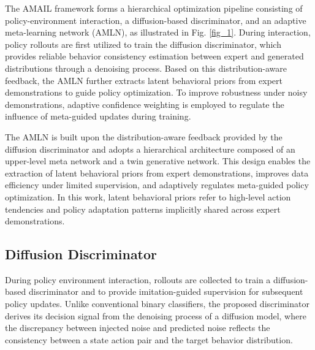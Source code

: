 \documentclass[journal]{IEEEtran}
\begin{document}

The AMAIL framework forms a hierarchical optimization pipeline consisting of policy-environment interaction, a diffusion-based discriminator, and an adaptive meta-learning network (AMLN), as illustrated in Fig. \ref{fig_1}. During interaction, policy rollouts are first utilized to train the diffusion discriminator, which provides reliable behavior consistency estimation between expert and generated distributions through a denoising process. Based on this distribution-aware feedback, the AMLN further extracts latent behavioral priors from expert demonstrations to guide policy optimization. To improve robustness under noisy demonstrations, adaptive confidence weighting is employed to regulate the influence of meta-guided updates during training.

The AMLN is built upon the distribution-aware feedback provided by the diffusion discriminator and adopts a hierarchical architecture composed of an upper-level meta network and a twin generative network. This design enables the extraction of latent behavioral priors from expert demonstrations, improves data efficiency under limited supervision, and adaptively regulates meta-guided policy optimization. In this work, latent behavioral priors refer to high-level action tendencies and policy adaptation patterns implicitly shared across expert demonstrations.

\subsection{Diffusion Discriminator}
During policy environment interaction, rollouts are collected to train a diffusion-based discriminator and to provide imitation-guided supervision for subsequent policy updates. Unlike conventional binary classifiers, the proposed discriminator derives its decision signal from the denoising process of a diffusion model\cite{ho2020denoising}, where the discrepancy between injected noise and predicted noise reflects the consistency between a state action pair and the target behavior distribution.
\end{document}

